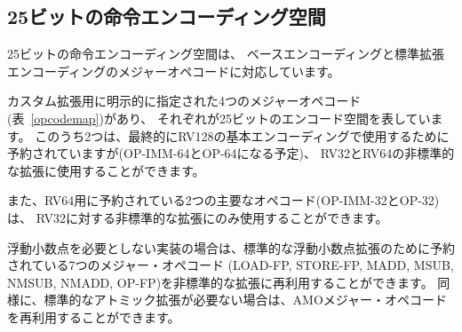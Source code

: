 \begin{comment}
\subsection*{Available 25-bit instruction encoding spaces}
\end{comment}
\subsection*{25ビットの命令エンコーディング空間}

\begin{comment}
A 25-bit instruction encoding space corresponds to a major opcode in
the base and standard extension encodings.
\end{comment}
25ビットの命令エンコーディング空間は、
ベースエンコーディングと標準拡張エンコーディングのメジャーオペコードに対応しています。

\begin{comment}
There are four major opcodes expressly designated for custom extensions
(Table~\ref{opcodemap}), each of which represents a 25-bit encoding
space.  Two of these are reserved for eventual use in the RV128 base
encoding (will be OP-IMM-64 and OP-64), but can be used for
non-standard extensions for RV32 and RV64.
\end{comment}
カスタム拡張用に明示的に指定された4つのメジャーオペコード(表~\ref{opcodemap})があり、
それぞれが25ビットのエンコード空間を表しています。
このうち2つは、最終的にRV128の基本エンコーディングで使用するために予約されていますが(OP-IMM-64とOP-64になる予定)、
RV32とRV64の非標準的な拡張に使用することができます。

\begin{comment}
The two major opcodes reserved for RV64 (OP-IMM-32 and OP-32) can also be
used for non-standard extensions to RV32 only.
\end{comment}
また、RV64用に予約されている2つの主要なオペコード(OP-IMM-32とOP-32)は、
RV32に対する非標準的な拡張にのみ使用することができます。

\begin{comment}
If an implementation does not require floating-point, then the seven
major opcodes reserved for standard floating-point extensions
(LOAD-FP, STORE-FP, MADD, MSUB, NMSUB, NMADD, OP-FP) can be reused for
non-standard extensions.  Similarly, the AMO major opcode can be
reused if the standard atomic extensions are not required.
\end{comment}
浮動小数点を必要としない実装の場合は、標準的な浮動小数点拡張のために予約されている7つのメジャー・オペコード
(LOAD-FP, STORE-FP, MADD, MSUB, NMSUB, NMADD, OP-FP)を非標準的な拡張に再利用することができます。
同様に、標準的なアトミック拡張が必要ない場合は、AMOメジャー・オペコードを再利用することができます。

